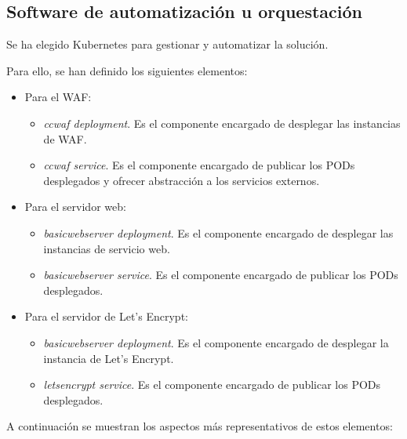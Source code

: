 \subsection{Software de automatización u orquestación}
\par Se ha elegido Kubernetes para gestionar y automatizar la solución.
\par Para ello, se han definido los siguientes elementos:
\begin{itemize}
  \item Para el WAF:
    \begin{itemize}
      \item {\em ccwaf deployment}. Es el componente encargado de desplegar las instancias de WAF.
      \item {\em ccwaf service}. Es el componente encargado de publicar los PODs desplegados y ofrecer abstracción a los servicios externos.
    \end{itemize}
  \item Para el servidor web:
    \begin{itemize}
      \item {\em basicwebserver deployment}. Es el componente encargado de desplegar las instancias de servicio web.
      \item {\em basicwebserver service}. Es el componente encargado de publicar los PODs desplegados.
    \end{itemize}
  \item Para el servidor de Let's Encrypt:
    \begin{itemize}
      \item {\em basicwebserver deployment}. Es el componente encargado de desplegar la instancia de Let's Encrypt.
      \item {\em letsencrypt service}. Es el componente encargado de publicar los PODs desplegados.
    \end{itemize}
\end{itemize}

\par A continuación se muestran los aspectos más representativos de estos elementos:

